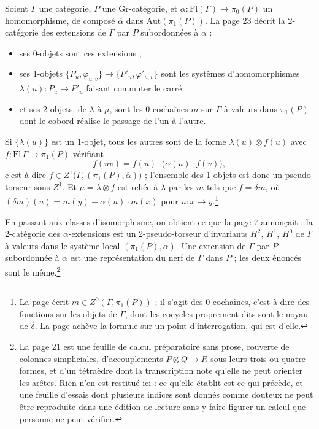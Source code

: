 \documentclass[11pt,a4paper]{article}
\begin{document}
Soient $\Gamma$ une catégorie, $P$ une Gr-catégorie, et $\alpha :
\mathrm{Fl}(\Gamma) \to \pi_{0}(P)$ un homomorphisme, de composé
$\overline{\alpha}$ dans $\mathrm{Aut}(\pi_{1}(P))$. La page 23 décrit la
2-catégorie des extensions de $\Gamma$ par $P$ subordonnées à $\alpha$ :

\begin{itemize}
\item ses 0-objets sont ces extensions ;
\item ses 1-objets $\{P_{u}, \varphi_{u,v}\} \to \{P'_{u},
\varphi'_{u,v}\}$ sont les systèmes d'homomorphismes $\lambda(u) : P_{u} \to
P'_{u}$ faisant commuter le carré
\end{itemize}


\begin{itemize}
\item et ses 2-objets, de $\lambda$ à $\mu$, sont les 0-cochaînes $m$ sur
$\Gamma$ à valeurs dans $\pi_{1}(P)$ dont le cobord réalise le passage de
l'un à l'autre.
\end{itemize}

Si $\{\lambda(u)\}$ est un
1-objet, tous les autres sont de la forme $\lambda(u) \otimes f(u)$ avec
$f : \mathrm{Fl}\,\Gamma \to \pi_{1}(P)$ vérifiant
\[
f(uv) = f(u) \cdot \bigl(\alpha(u) \cdot f(v)\bigr),
\]
c'est-à-dire $f \in Z^{1}\bigl(\Gamma, (\pi_{1}(P),
\overline{\alpha})\bigr)$ ; l'ensemble des 1-objets est donc un
pseudo-torseur sous $Z^{1}$. Et $\mu = \lambda \otimes f$ est reliée à
$\lambda$ par les $m$ tels que $f = \delta m$, où
$(\delta m)(u) = m(y) - \alpha(u) \cdot m(x)$ pour $u : x \to
y$.\footnote{La page écrit $m \in Z^{0}(\Gamma, \pi_{1}(P))$ ; il s'agit des
0-cochaînes, c'est-à-dire des fonctions sur les objets de $\Gamma$, dont les
cocycles proprement dits sont le noyau de $\delta$. La page achève la formule
sur un point d'interrogation, qui est d'elle.}

En passant aux classes d'isomorphisme, on obtient ce que la page 7
annonçait : la 2-catégorie des $\alpha$-extensions est un 2-pseudo-torseur
d'invariants $H^{2}$, $H^{1}$, $H^{0}$ de $\Gamma$ à valeurs dans le système
local $(\pi_{1}(P), \overline{\alpha})$. Une extension de $\Gamma$ par $P$
subordonnée à $\alpha$ est une représentation du nerf de $\Gamma$ dans $P$ ;
les deux énoncés sont le même.\footnote{La page 21 est une feuille de calcul
préparatoire sans prose, couverte de colonnes simpliciales, d'accouplements
$P \otimes Q \to R$ sous leurs trois ou quatre formes, et d'un tétraèdre dont
la transcription note qu'elle ne peut orienter les arêtes. Rien n'en est
restitué ici : ce qu'elle établit est ce qui précède, et une feuille d'essais
dont plusieurs indices sont donnés comme douteux ne peut être reproduite dans
une édition de lecture sans y faire figurer un calcul que personne ne peut
vérifier.}
\end{document}
